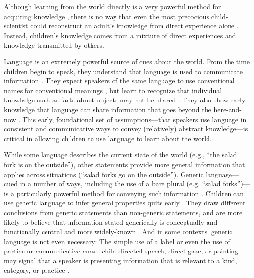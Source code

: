 \documentclass[man]{apa2}
\begin{document}
Although learning from the world directly is a very powerful method for acquiring knowledge \cite{gopnik2012b}, there is no way that even the most precocious child-scientist could reconstruct an adult's knowledge from direct experience alone \cite{shafto2012,harris2012}. Instead, children's knowledge comes from a mixture of direct experiences and knowledge transmitted by others. 

Language is an extremely powerful source of cues about the world. From the time children begin to speak, they understand that language is used to communicate information \cite{vouloumanos2012,martin2012}. They expect speakers of the same language to use conventional names for conventional meanings \cite{clark1987, markman1988, diesendruck2005}, but learn to recognize that individual knowledge such as facts about objects may not be shared \cite{diesendruck2001}. They also show early knowledge that language can share information that goes beyond the here-and-now \cite{saylor2007,ganea2007}. This early, foundational set of assumptions---that speakers use language in consistent and communicative ways to convey (relatively) abstract knowledge---is critical in allowing children to use language to learn about the world. 

While some language describes the current state of the world (e.g., ``the salad fork is on the outside''), other statements provide more general information that applies across situations (``salad forks go on the outside''). Generic language---cued in a number of ways, including the use of a bare plural (e.g. ``salad forks'')---is a particularly powerful method for conveying such information \cite{leslie2008}. Children can use generic language to infer general properties quite early \cite{gelman2003}. They draw different conclusions from generic statements than non-generic statements, and are more likely to believe that information stated generically is  conceptually and functionally central and more widely-known \cite{cimpian2009, cimpian2010, cimpian2012}. And in some contexts, generic language is not even necessary: The simple use of a label or even the use of particular communicative cues---child-directed speech, direct gaze, or pointing---may signal that a speaker is presenting information that is relevant to a kind, category, or practice \cite{csibra2009, butler2012}. 
\end{document}
